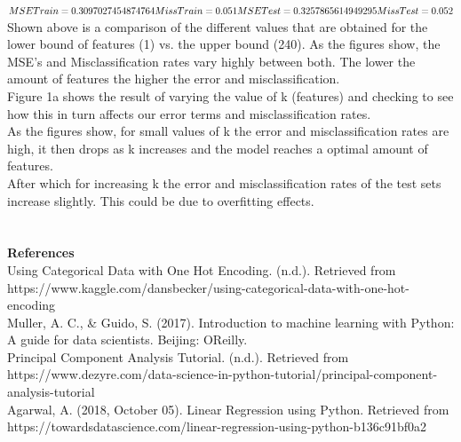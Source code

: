\documentclass[a4paper]{article}
\begin{document}
$MSE Train = 0.3097027454874764 \\ Miss Train = 0.051 \\ MSE Test = 0.3257865614949295 \\ Miss Test = 0.052$
\\

Shown above is a comparison of the different values that are obtained for the lower bound of features (1) vs. the upper bound (240). As the figures show, the MSE's and Misclassification rates vary highly between both. The lower the amount of features the higher the error and misclassification. \\



Figure 1a shows the result of varying the value of k (features) and checking to see how this in turn affects our error terms and misclassification rates. \\


As the figures show, for small values of k the error and misclassification rates are high, it then drops as k increases and the model reaches a optimal amount of features. \\ After which for increasing k the error and misclassification rates of the test sets increase slightly. This could be due to overfitting effects. \\ \\
\\

\textbf{{\Large References}} \\

Using Categorical Data with One Hot Encoding. (n.d.). Retrieved from \\ https://www.kaggle.com/dansbecker/using-categorical-data-with-one-hot-encoding \\

Muller, A. C., \& Guido, S. (2017). Introduction to machine learning with Python: A guide for data scientists. Beijing: OReilly. \\

Principal Component Analysis Tutorial. (n.d.). Retrieved from https://www.dezyre.com/data-science-in-python-tutorial/principal-component-analysis-tutorial \\

Agarwal, A. (2018, October 05). Linear Regression using Python. Retrieved from \\ https://towardsdatascience.com/linear-regression-using-python-b136c91bf0a2 \\
\end{document}
